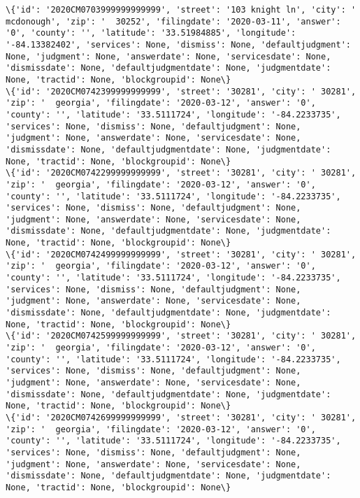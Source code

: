 \documentclass[11pt]{article}
\begin{document}
\begin{Verbatim}[commandchars=\\\{\}]
\{'id': '2020CM0703999999999999', 'street': '103 knight ln', 'city': '  mcdonough', 'zip': '  30252', 'filingdate': '2020-03-11', 'answer': '0', 'county': '', 'latitude': '33.51984885', 'longitude': '-84.13382402', 'services': None, 'dismiss': None, 'defaultjudgment': None, 'judgment': None, 'answerdate': None, 'servicesdate': None, 'dismissdate': None, 'defaultjudgmentdate': None, 'judgmentdate': None, 'tractid': None, 'blockgroupid': None\}
\{'id': '2020CM0742399999999999', 'street': '30281', 'city': ' 30281', 'zip': '  georgia', 'filingdate': '2020-03-12', 'answer': '0', 'county': '', 'latitude': '33.5111724', 'longitude': '-84.2233735', 'services': None, 'dismiss': None, 'defaultjudgment': None, 'judgment': None, 'answerdate': None, 'servicesdate': None, 'dismissdate': None, 'defaultjudgmentdate': None, 'judgmentdate': None, 'tractid': None, 'blockgroupid': None\}
\{'id': '2020CM0742299999999999', 'street': '30281', 'city': ' 30281', 'zip': '  georgia', 'filingdate': '2020-03-12', 'answer': '0', 'county': '', 'latitude': '33.5111724', 'longitude': '-84.2233735', 'services': None, 'dismiss': None, 'defaultjudgment': None, 'judgment': None, 'answerdate': None, 'servicesdate': None, 'dismissdate': None, 'defaultjudgmentdate': None, 'judgmentdate': None, 'tractid': None, 'blockgroupid': None\}
\{'id': '2020CM0742499999999999', 'street': '30281', 'city': ' 30281', 'zip': '  georgia', 'filingdate': '2020-03-12', 'answer': '0', 'county': '', 'latitude': '33.5111724', 'longitude': '-84.2233735', 'services': None, 'dismiss': None, 'defaultjudgment': None, 'judgment': None, 'answerdate': None, 'servicesdate': None, 'dismissdate': None, 'defaultjudgmentdate': None, 'judgmentdate': None, 'tractid': None, 'blockgroupid': None\}
\{'id': '2020CM0742599999999999', 'street': '30281', 'city': ' 30281', 'zip': '  georgia', 'filingdate': '2020-03-12', 'answer': '0', 'county': '', 'latitude': '33.5111724', 'longitude': '-84.2233735', 'services': None, 'dismiss': None, 'defaultjudgment': None, 'judgment': None, 'answerdate': None, 'servicesdate': None, 'dismissdate': None, 'defaultjudgmentdate': None, 'judgmentdate': None, 'tractid': None, 'blockgroupid': None\}
\{'id': '2020CM0742699999999999', 'street': '30281', 'city': ' 30281', 'zip': '  georgia', 'filingdate': '2020-03-12', 'answer': '0', 'county': '', 'latitude': '33.5111724', 'longitude': '-84.2233735', 'services': None, 'dismiss': None, 'defaultjudgment': None, 'judgment': None, 'answerdate': None, 'servicesdate': None, 'dismissdate': None, 'defaultjudgmentdate': None, 'judgmentdate': None, 'tractid': None, 'blockgroupid': None\}

\end{Verbatim}
\end{document}
